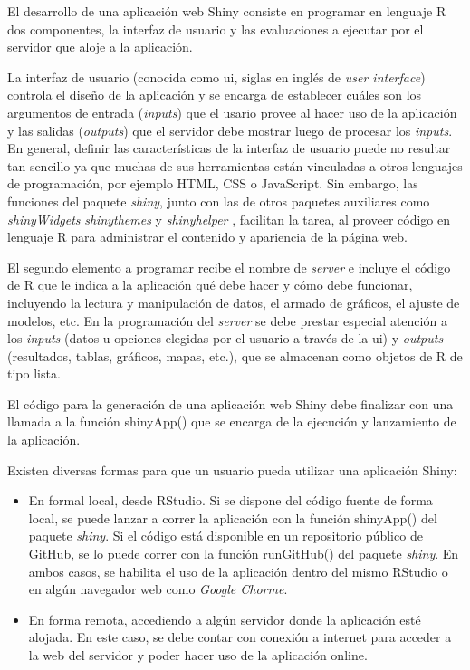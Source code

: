 El desarrollo de una aplicación web Shiny consiste en programar en lenguaje R dos componentes, la interfaz de usuario y las evaluaciones a ejecutar por el servidor que aloje a la aplicación.

La interfaz de usuario (conocida como ui, siglas en inglés de \emph{user interface}) controla el diseño de la aplicación y se encarga de establecer cuáles son los argumentos de entrada (\emph{inputs}) que el usario provee al hacer uso de la aplicación y las salidas (\emph{outputs}) que el servidor debe mostrar luego de procesar los \emph{inputs}. En general, definir las características de la interfaz de usuario puede no resultar tan sencillo ya que muchas de sus herramientas están vinculadas a otros lenguajes de programación, por ejemplo HTML, CSS o JavaScript. Sin embargo, las funciones del paquete \emph{shiny}, junto con las de otros paquetes auxiliares como \emph{shinyWidgets} \citep{Perrieretal2020} \emph{shinythemes} \citep{Chang2018} y \emph{shinyhelper} \citep{Mason2019}, facilitan la tarea, al proveer código en lenguaje R para administrar el contenido y apariencia de la página web.

El segundo elemento a programar recibe el nombre de \emph{server} e incluye el código de R que le indica a la aplicación qué debe hacer y cómo debe funcionar, incluyendo la lectura y manipulación de datos, el armado de gráficos, el ajuste de modelos, etc. En la programación del \emph{server} se debe prestar especial atención a los \emph{inputs} (datos u opciones elegidas por el usuario a través de la ui) y \emph{outputs} (resultados, tablas, gráficos, mapas, etc.), que se almacenan como objetos de R de tipo lista.

El código para la generación de una aplicación web Shiny debe finalizar con una llamada a la función \textcolor{fandango}{shinyApp()} que se encarga de la ejecución y lanzamiento de la aplicación.

Existen diversas formas para que un usuario pueda utilizar una aplicación Shiny:

\begin{itemize}

\item En formal local, desde RStudio. Si se dispone del código fuente de forma local, se puede lanzar a correr la aplicación con la función \textcolor{fandango}{shinyApp()} del paquete \emph{shiny}. Si el código está disponible en un repositorio público de GitHub, se lo puede correr con la función \textcolor{fandango}{runGitHub()} del paquete \emph{shiny}. En ambos casos, se habilita el uso de la aplicación dentro del mismo RStudio o en algún navegador web como \emph{Google Chorme}.

\item En forma remota, accediendo a algún servidor donde la aplicación esté alojada. En este caso, se debe contar con conexión a internet para acceder a la web del servidor y poder hacer uso de la aplicación online.

\end{itemize}





